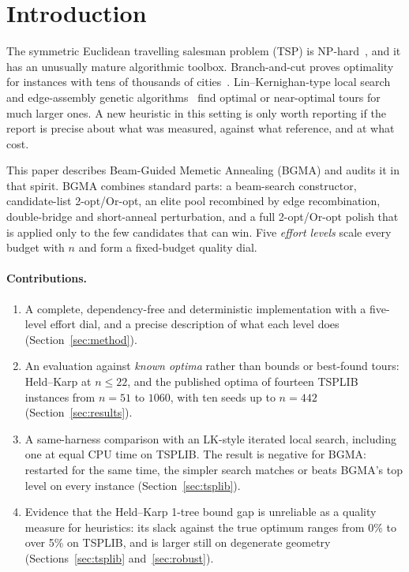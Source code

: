 \section{Introduction}\label{sec:intro}

The symmetric Euclidean travelling salesman problem (TSP) is NP-hard~\citep{papadimitriou1977}, and it
has an unusually mature algorithmic toolbox. Branch-and-cut proves optimality for instances with tens
of thousands of cities~\citep{applegate2006}. Lin--Kernighan-type local search~\citep{lin1973,helsgaun2000,helsgaun2009}
and edge-assembly genetic algorithms~\citep{nagata2013} find optimal or near-optimal tours for much
larger ones. A new heuristic in this setting is only worth reporting if the report is precise about
what was measured, against what reference, and at what cost.

This paper describes Beam-Guided Memetic Annealing (BGMA) and audits it in that spirit. BGMA combines
standard parts: a beam-search constructor, candidate-list 2-opt/Or-opt, an elite pool recombined by edge
recombination, double-bridge and short-anneal perturbation, and a full 2-opt/Or-opt polish that is
applied only to the few candidates that can win. Five \emph{effort levels} scale every budget with $n$
and form a fixed-budget quality dial.

\paragraph{Contributions.}
\begin{enumerate}\itemsep2pt
\item A complete, dependency-free and deterministic implementation with a five-level effort dial, and
a precise description of what each level does (Section~\ref{sec:method}).
\item An evaluation against \emph{known optima} rather than bounds or best-found tours: Held--Karp at
$n\le 22$, and the published optima of fourteen TSPLIB instances from $n=51$ to $1060$, with ten
seeds up to $n=442$ (Section~\ref{sec:results}).
\item A same-harness comparison with an LK-style iterated local search, including one at equal CPU
time on TSPLIB. The result is negative for BGMA: restarted for the same time, the simpler search
matches or beats BGMA's top level on every instance (Section~\ref{sec:tsplib}).
\item Evidence that the Held--Karp 1-tree bound gap is unreliable as a quality measure for heuristics:
its slack against the true optimum ranges from 0\% to over 5\% on TSPLIB, and is larger still on
degenerate geometry (Sections~\ref{sec:tsplib} and~\ref{sec:robust}).
\end{enumerate}

